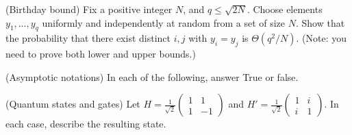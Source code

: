 \begin{questions}
  \question[10] (Birthday bound) Fix a positive integer $N$, and
  $q\leq \sqrt{2N}$. Choose elements $y_1, \ldots, y_q$ uniformly and
  independently at random from a set of size $N$. Show that the
  probability that there exist distinct $i, j$ with $y_i = y_j$ is
  $\Theta(q^2/N)$. (Note: you need to prove both lower and upper
  bounds.)

  
  \question[8] (Asymptotic notations) In each of the following, answer
  True or false.


  \question[12] (Quantum states and gates) Let
  $H = \frac{1}{\sqrt 2} \left(
    \begin{array}{lr}
      1 & 1\\
      1 & -1
    \end{array} \right)$ and $ H' = \frac{1}{\sqrt 2} \left(
    \begin{array}{lr}
      1 & i\\
      i & 1
    \end{array} \right)$. In each case, describe the
  resulting state.  
  \begin{parts}

\end{parts}
\end{questions}
